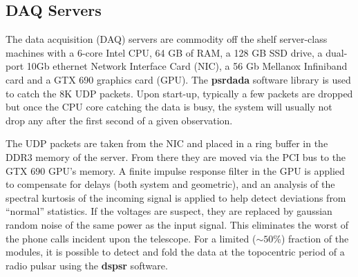 \subsection {DAQ Servers}

The data acquisition (DAQ) servers are commodity off the shelf server-class machines with a 6-core Intel CPU, 64 GB of RAM, a 128 GB SSD drive, a dual-port 10Gb ethernet Network Interface Card (NIC), a 56 Gb Mellanox Infiniband card and a GTX 690 graphics card (GPU). The {\bf psrdada} software library is used to catch the 8K UDP packets. Upon start-up, typically a few packets are dropped but once the CPU core catching the data is busy, the system will usually not drop any after the first second of a given observation. 

The UDP packets are taken from the NIC and placed in a ring buffer
in the DDR3 memory of the server. From there they are moved via the PCI bus to the GTX 690 GPU's memory. A finite impulse response filter in the GPU is applied to compensate for delays (both system and geometric), and an analysis of the spectral kurtosis of the incoming signal is applied to help detect deviations from ``normal'' statistics. If the voltages are suspect, they are replaced by gaussian random noise of the same power as the input signal. This eliminates the worst of the phone calls incident upon the telescope. For a limited ($\sim50$\%) fraction of the modules, it is possible to detect and fold the data at the topocentric period of a radio pulsar using the {\bf dspsr} software.

